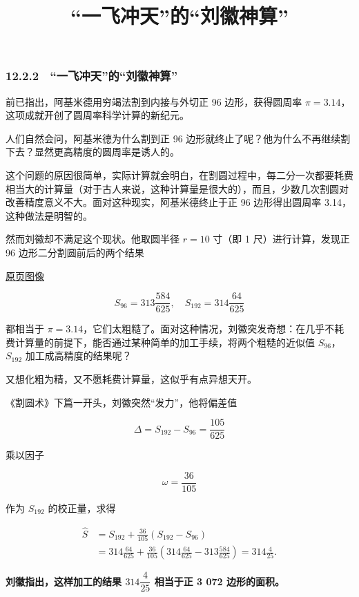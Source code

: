 \documentclass[
  10pt,
  fontset=fandol]{ctexart}
\title{``一飞冲天''的``刘徽神算''}
\author{}
\date{}
\begin{document}
\maketitle

\subsubsection{12.2.2　``一飞冲天''的``刘徽神算''}\label{ux4e00ux98deux51b2ux5929ux7684ux5218ux5fbdux795eux7b97}

前已指出，阿基米德用穷竭法割到内接与外切正 96 边形，获得圆周率 \(\pi=3.14\)，这项成就开创了圆周率科学计算的新纪元。

人们自然会问，阿基米德为什么割到正 96 边形就终止了呢？他为什么不再继续割下去？显然更高精度的圆周率是诱人的。

这个问题的原因很简单，实际计算就会明白，在割圆过程中，每二分一次都要耗费相当大的计算量（对于古人来说，这种计算量是很大的），而且，少数几次割圆对改善精度意义不大。面对这种现实，阿基米德终止于正 96 边形得出圆周率 3.14，这种做法是明智的。

然而刘徽却不满足这个现状。他取圆半径 \(r=10\) 寸（即 1 尺）进行计算，发现正 96 边形二分割圆前后的两个结果

\href{../../source-images/pdf-297.jpeg}{原页图像}

\[
S_{96}=313\frac{584}{625},\quad S_{192}=314\frac{64}{625}
\]

都相当于 \(\pi=3.14\)，它们太粗糙了。面对这种情况，刘徽突发奇想：在几乎不耗费计算量的前提下，能否通过某种简单的加工手续，将两个粗糙的近似值 \(S_{96}\)，\(S_{192}\) 加工成高精度的结果呢？

又想化粗为精，又不愿耗费计算量，这似乎有点异想天开。

《割圆术》下篇一开头，刘徽突然``发力''，他将偏差值

\[
\Delta=S_{192}-S_{96}=\frac{105}{625}
\]

乘以因子

\[
\omega=\frac{36}{105}
\tag{12.2.1}
\]

作为 \(S_{192}\) 的校正量，求得

\[
\begin{aligned}
\widehat S&=S_{192}+\frac{36}{105}(S_{192}-S_{96})\\
&=314\frac{64}{625}+\frac{36}{105}\left(314\frac{64}{625}-313\frac{584}{625}\right)=314\frac{4}{25}.
\end{aligned}
\tag{12.2.2}
\]

\textbf{刘徽指出，这样加工的结果 \(314\dfrac{4}{25}\) 相当于正 3 072 边形的面积。}
\end{document}
